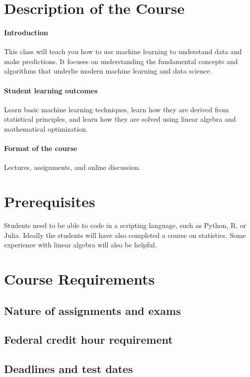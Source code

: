 \documentclass[11pt]{article}
\begin{document}
\section{Description of the Course}

\paragraph{Introduction}
This class will teach you how to use machine learning to understand data and make predictions. It focuses on understanding the fundamental concepts and algorithms that underlie modern machine learning and data science.

\paragraph{Student learning outcomes}
Learn basic machine learning techniques, learn how they are derived from statistical principles, and learn how they are solved using linear algebra and mathematical optimization.

\paragraph{Format of the course}
Lectures, assignments, and online discussion.

\section{Prerequisites}

Students need to be able to code in a scripting language, such as Python, R, or Julia. Ideally the students will have also completed a course on statistics. Some experience with linear algebra will also be helpful.

\section{Course Requirements}

\subsection{Nature of assignments and exams}

\subsection{Federal credit hour requirement}

\subsection{Deadlines and test dates}
\end{document}
